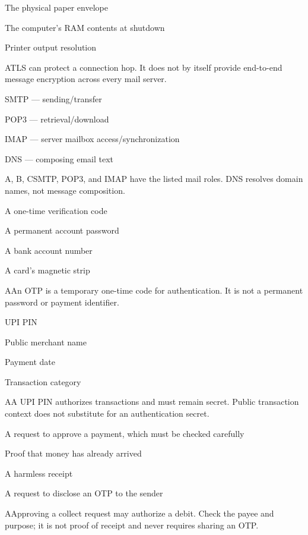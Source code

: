 \begin{enumerate}[label=\textbf{Q\arabic*.}, leftmargin=*]
{   \item The physical paper envelope
   \item The computer's RAM contents at shutdown
   \item Printer output resolution}
  {A}{TLS can protect a connection hop. It does not by itself provide end-to-end message encryption across every mail server.}
  {\item SMTP --- sending/transfer
   \item POP3 --- retrieval/download
   \item IMAP --- server mailbox access/synchronization
   \item DNS --- composing email text}
  {A, B, C}{SMTP, POP3, and IMAP have the listed mail roles. DNS resolves domain names, not message composition.}
\fi
\ifnum{}
  {\item A one-time verification code
   \item A permanent account password
   \item A bank account number
   \item A card's magnetic strip}
  {A}{An OTP is a temporary one-time code for authentication. It is not a permanent password or payment identifier.}
  {\item UPI PIN
   \item Public merchant name
   \item Payment date
   \item Transaction category}
  {A}{A UPI PIN authorizes transactions and must remain secret. Public transaction context does not substitute for an authentication secret.}
  {\item A request to approve a payment, which must be checked carefully
   \item Proof that money has already arrived
   \item A harmless receipt
   \item A request to disclose an OTP to the sender}
  {A}{Approving a collect request may authorize a debit. Check the payee and purpose; it is not proof of receipt and never requires sharing an OTP.}

\end{enumerate}
